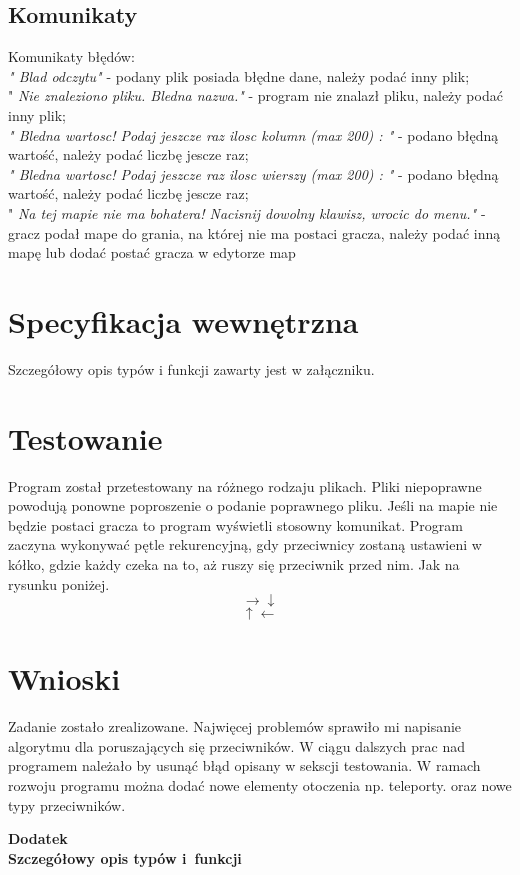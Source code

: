 \documentclass[12pt,a4paper,twoside]{article}
\begin{document}
\subsection{Komunikaty}

Komunikaty błędów:\\
\textit{" Blad odczytu"} - podany plik posiada błędne dane, należy podać inny plik;\\
"\textit{ Nie znaleziono pliku. Bledna nazwa." }- program nie znalazł pliku, należy podać inny plik;\\
\textit{" Bledna wartosc! Podaj jeszcze raz ilosc kolumn (max 200) : "} - podano błędną wartość, należy podać liczbę jescze raz;\\
\textit{" Bledna wartosc! Podaj jeszcze raz ilosc wierszy (max 200) : "} - podano błędną wartość, należy podać liczbę jescze raz;\\
"\textit{ Na tej mapie nie ma bohatera! Nacisnij dowolny klawisz, wrocic do menu."} - gracz podał mape do grania, na której nie ma postaci gracza, należy podać inną mapę lub dodać postać gracza w edytorze map\\

\section{Specyfikacja wewnętrzna}\label{sec:sp-wew}

Szczegółowy opis typów i funkcji zawarty jest w załączniku.

 

\section{Testowanie}
Program został przetestowany na różnego rodzaju plikach. Pliki niepoprawne powodują ponowne poproszenie o podanie poprawnego pliku. Jeśli na mapie nie będzie postaci gracza to program wyświetli stosowny komunikat. Program zaczyna wykonywać pętle rekurencyjną, gdy przeciwnicy zostaną ustawieni w kółko, gdzie każdy czeka na to, aż ruszy się przeciwnik przed nim. Jak na rysunku poniżej.
\\
\[ 
\rightarrow{}\downarrow{}
\]
\[ 
\uparrow{}\leftarrow{}
\]

\section{Wnioski}
Zadanie zostało zrealizowane. Najwięcej problemów sprawiło mi napisanie algorytmu dla poruszających się przeciwników. W ciągu dalszych prac nad programem należało by usunąć błąd opisany w sekscji testowania. W ramach rozwoju programu można dodać nowe elementy otoczenia np. teleporty. oraz nowe typy przeciwników.




\cleardoublepage

\vfill

\begin{center}
\Huge\bfseries Dodatek\\Szczegółowy opis typów i~funkcji\par
\end{center}

\vfill 

\rule{0cm}{0cm}
\end{document}
